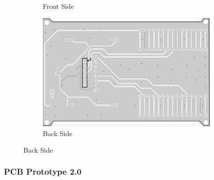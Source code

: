 \begin{figure}[H]
\begin{subfigure}[b]{0.4\linewidth}
        \caption{Front Side}
        \label{fig:pcb1-front}
    \end{subfigure}
    \hfill
    \begin{subfigure}[b]{0.4\linewidth}
        \centering
        \includegraphics[width=\linewidth]{img/PCBit1_back.png}
        \caption{Back Side}
        \label{fig:pcb1-back}
    \end{subfigure}
    \label{fig:pcb1}
\end{figure}

\subsubsection{PCB Prototype 2.0}

